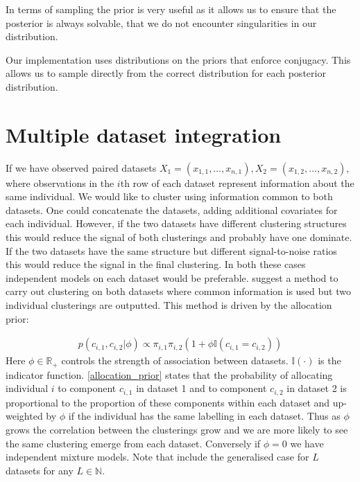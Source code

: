 \documentclass[11pt]{article} %
\begin{document}
In terms of sampling the prior is very useful as it allows us to ensure that the posterior is always solvable, that we do not encounter singularities in our distribution.

Our implementation uses distributions on the priors that enforce conjugacy. This allows us to sample directly from the correct distribution for each posterior distribution.

\section{Multiple dataset integration}
If we have observed paired datasets $X_1 = (x_{1,1},\ldots,x_{n,1}), X_2 = (x_{1,2},\ldots,x_{n,2})$, where observations in the $i$th row of each dataset represent information about the same individual. We would like to cluster using information common to both datasets. One could concatenate the datasets, adding additional covariates for each individual. However, if the two datasets have different clustering structures this would reduce the signal of both clusterings and probably have one dominate. If the two datasets have the same structure but different signal-to-noise ratios this would reduce the signal in the final clustering. In both these cases independent models on each dataset would be preferable. \citet{kirkBayesianCorrelatedClustering2012} suggest a method to carry out clustering on both datasets where common information is used but two individual clusterings are outputted. This method is driven by the allocation prior:

\begin{align} \label{allocation_prior}
p(c_{i,1}, c_{i,2} | \phi ) \propto \pi_{i,1} \pi_{i,2} (1 + \phi \mathbb{I}(c_{i,1} = c_{i,2}))
\end{align}
Here $\phi \in \mathbb{R}_+$ controls the strength of association between datasets. $\mathbb{I}(\cdot)$ is the indicator function. \eqref{allocation_prior} states that the probability of allocating individual $i$ to component $c_{i,1}$ in dataset 1 and to component $c_{i,2}$ in dataset 2 is proportional to the proportion of these components within each dataset and up-weighted by $\phi$ if the individual has the same labelling in each dataset. Thus as $\phi$ grows the correlation between the clusterings grow and we are more likely to see the same clustering emerge from each dataset. Conversely if $\phi = 0$ we have independent mixture models. Note that \citet{kirkBayesianCorrelatedClustering2012} include the generalised case for $L$ datasets for any $L \in \mathbb{N}$.
\end{document}
